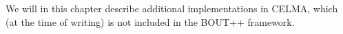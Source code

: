 We will in this chapter describe additional implementations in CELMA, which (at the time of writing) is not included in the BOUT++ framework.

